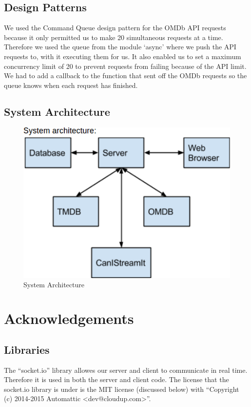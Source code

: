 \documentclass{article}
\begin{document}
\subsection{Design Patterns}
We used the Command Queue design pattern for the OMDb API requests because it only permitted us to make 20 simultaneous requests at a time. Therefore we used the queue from the module ‘async’ where we push the API requests to, with it executing them for us. It also enabled us to set a maximum concurrency limit of 20 to prevent requests from failing because of the API limit. We had to add a callback to the function that sent off the OMDb requests so the queue knows when each request has finished.
\subsection{System Architecture}
\begin{figure}[H]
\centering
\caption{System Architecture}
\label{sec:sysarchitecture}
\includegraphics[scale=0.5]{sysarchitecture}
\end{figure}
\section{Acknowledgements}
\subsection{Libraries}
\label{subsec:nodelibraries}
The “socket.io” library allowes our server and client to communicate in real time. Therefore it is used in both the server and client code. The license that the socket.io library is under is the MIT license (discussed below) with “Copyright (c) 2014-2015 Automattic \textless dev@cloudup.com\textgreater ”.
\end{document}
